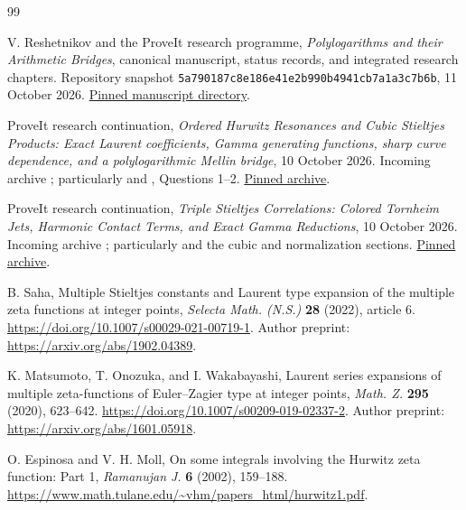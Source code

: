 \begin{thebibliography}{99}

V. Reshetnikov and the ProveIt research programme,
\emph{Polylogarithms and their Arithmetic Bridges}, canonical manuscript,
status records, and integrated research chapters. Repository snapshot
\texttt{5a790187c8e186e41e2b990b4941cb7a1a3c7b6b}, 11 October 2026.
\href{https://github.com/VladimirReshetnikov/ProveIt/tree/5a790187c8e186e41e2b990b4941cb7a1a3c7b6b/Analysis/Polylogarithms/docs/manuscript}{Pinned manuscript directory}.

ProveIt research continuation,
\emph{Ordered Hurwitz Resonances and Cubic Stieltjes Products:
Exact Laurent coefficients, Gamma generating functions, sharp curve
dependence, and a polylogarithmic Mellin bridge}, 10 October 2026.
Incoming archive ;
particularly  and
, Questions 1--2.
\href{https://github.com/VladimirReshetnikov/ProveIt/blob/5a790187c8e186e41e2b990b4941cb7a1a3c7b6b/docs/incoming/ProveIt_Ordered_Hurwitz_Resonances_2026-10-10.zip}{Pinned archive}.

ProveIt research continuation,
\emph{Triple Stieltjes Correlations: Colored Tornheim Jets, Harmonic
Contact Terms, and Exact Gamma Reductions}, 10 October 2026.
Incoming archive ;
particularly  and the cubic and
normalization sections.
\href{https://github.com/VladimirReshetnikov/ProveIt/blob/5a790187c8e186e41e2b990b4941cb7a1a3c7b6b/docs/incoming/ProveIt_Triple_Stieltjes_Tornheim_2026-10-10.zip}{Pinned archive}.

B. Saha, Multiple Stieltjes constants and Laurent type expansion of the
multiple zeta functions at integer points,
\emph{Selecta Math. (N.S.)} \textbf{28} (2022), article 6.
\url{https://doi.org/10.1007/s00029-021-00719-1}.
Author preprint: \url{https://arxiv.org/abs/1902.04389}.

K. Matsumoto, T. Onozuka, and I. Wakabayashi,
Laurent series expansions of multiple zeta-functions of Euler--Zagier
type at integer points, \emph{Math. Z.} \textbf{295} (2020), 623--642.
\url{https://doi.org/10.1007/s00209-019-02337-2}.
Author preprint: \url{https://arxiv.org/abs/1601.05918}.

O. Espinosa and V. H. Moll,
On some integrals involving the Hurwitz zeta function: Part 1,
\emph{Ramanujan J.} \textbf{6} (2002), 159--188.
\url{https://www.math.tulane.edu/~vhm/papers_html/hurwitz1.pdf}.


\end{thebibliography}
